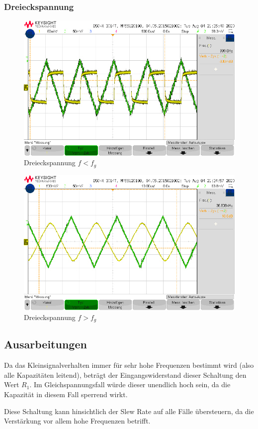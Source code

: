 \subsubsection{Dreieckspannung}
\begin{figure}[H]
    \centering
    \includegraphics[width=\costumPicWidth]{Lab_2/Messungen/HP_first_order/scope_5.png}
    \caption{Dreieckspannung $f<f_g$}
    \label{fig:HP_FO_Dreieck_kleiner}
\end{figure}
\begin{figure}[H]
    \centering
    \includegraphics[width=\costumPicWidth]{Lab_2/Messungen/HP_first_order/scope_2.png}
    \caption{Dreieckspannung $f>f_g$}
    \label{fig:HP_FO_Dreieck}
\end{figure}

\subsection{Ausarbeitungen}
Da das Kleinsignalverhalten immer für sehr hohe Frequenzen bestimmt wird (also alle Kapazitäten leitend), beträgt der Eingangswiderstand dieser Schaltung den Wert $R_1$. Im Gleichspannungsfall würde dieser unendlich hoch sein, da die Kapazität in diesem Fall sperrend wirkt.

Diese Schaltung kann hinsichtlich der Slew Rate auf alle Fälle übersteuern, da die Verstärkung vor allem hohe Frequenzen betrifft.